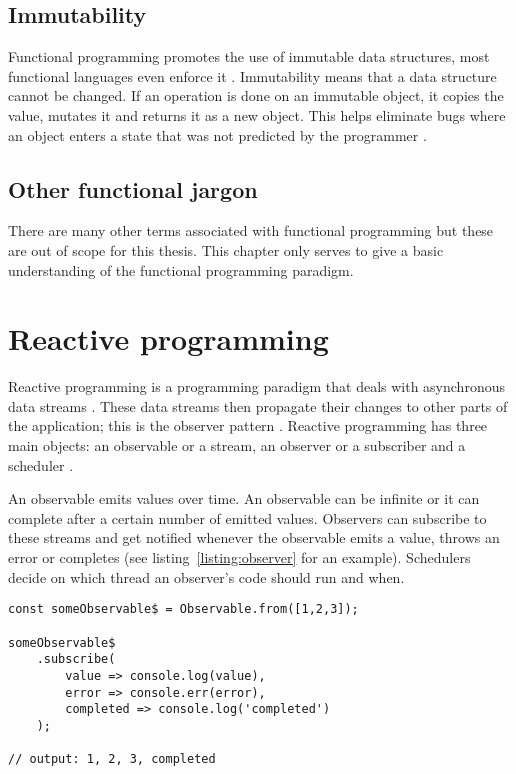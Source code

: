 \subsection{Immutability}

Functional programming promotes the use of immutable data structures, most functional languages even enforce it \cite{func-js}. Immutability means that a data structure cannot be changed. If an operation is done on an immutable object, it copies the value, mutates it and returns it as a new object. This helps eliminate bugs where an object enters a state that was not predicted by the programmer \cite{intro-func}.

\subsection{Other functional jargon}

There are many other terms associated with functional programming but these are out of scope for this thesis. This chapter only serves to give a basic understanding of the functional programming paradigm.

\section{Reactive programming}
\label{sub:rp}

Reactive programming is a programming paradigm that deals with asynchronous data streams \cite{intro-reactive}. These data streams then propagate their changes to other parts of the application; this is the observer pattern \cite{observer}. Reactive programming has three main objects: an observable or a stream, an observer or a subscriber and a scheduler \cite{intro-reactive}.

An observable emits values over time. An observable can be infinite or it can complete after a certain number of emitted values. Observers can subscribe to these streams and get notified whenever the observable emits a value, throws an error or completes (see listing~\ref{listing:observer} for an example). Schedulers decide on which thread an observer's code should run and when.

\begin{lstlisting}[caption=An observable and observer in RxJS,label=listing:observer]
const someObservable$ = Observable.from([1,2,3]);

someObservable$
	.subscribe(
		value => console.log(value),
		error => console.err(error),
		completed => console.log('completed')
	);
	
// output: 1, 2, 3, completed
\end{lstlisting}

